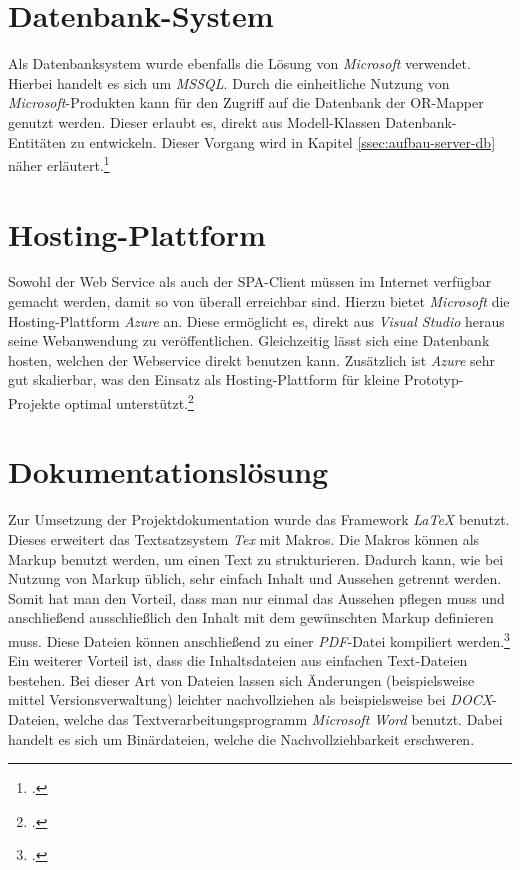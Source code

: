 \section{Datenbank-System}
\label{sec:DB-System}
Als Datenbanksystem wurde ebenfalls die Lösung von \textit{Microsoft} verwendet. Hierbei handelt es sich um \textit{\ac{MSSQL}}. Durch die einheitliche Nutzung von \textit{Microsoft}-Produkten kann für den Zugriff auf die Datenbank der \ac{OR-Mapper} genutzt werden. Dieser erlaubt es, direkt aus Modell-Klassen Datenbank-Entitäten zu entwickeln. Dieser Vorgang wird in Kapitel \ref{ssec:aufbau-server-db} näher erläutert.\footcite{online:SQLServer}
\section{Hosting-Plattform}
\label{sec:Hosting-Plattform}
Sowohl der Web Service als auch der \ac{SPA}-Client müssen im Internet verfügbar gemacht werden, damit so von überall erreichbar sind. Hierzu bietet \textit{Microsoft} die Hosting-Plattform \textit{Azure} an. Diese ermöglicht es, direkt aus \textit{\ac{Visual Studio}} heraus seine Webanwendung zu veröffentlichen. Gleichzeitig lässt sich eine Datenbank hosten, welchen der Webservice direkt benutzen kann. Zusätzlich ist \textit{Azure} sehr gut skalierbar, was den Einsatz als Hosting-Plattform für kleine Prototyp-Projekte optimal unterstützt.\footcite{online:Azure}
\section{Dokumentationslösung}
\label{sec:dokumentationslösung}
Zur Umsetzung der Projektdokumentation wurde das Framework \textit{LaTeX} benutzt. Dieses erweitert das Textsatzsystem \textit{Tex} mit Makros. Die Makros können als Markup benutzt werden, um einen Text zu strukturieren. Dadurch kann, wie bei Nutzung von Markup üblich, sehr einfach Inhalt und Aussehen getrennt werden. Somit hat man den Vorteil, dass man nur einmal das Aussehen pflegen muss und anschließend ausschließlich den Inhalt mit dem gewünschten Markup definieren muss. Diese Dateien können anschließend zu einer \textit{PDF}-Datei kompiliert werden.\footcite{online:definition-latex}\\ Ein weiterer Vorteil ist, dass die Inhaltsdateien aus einfachen Text-Dateien bestehen. Bei dieser Art von Dateien lassen sich Änderungen (beispielsweise mittel Versionsverwaltung) leichter nachvollziehen als beispielsweise bei \textit{DOCX}-Dateien, welche das Textverarbeitungsprogramm \textit{Microsoft Word} benutzt. Dabei handelt es sich um Binärdateien, welche die Nachvollziehbarkeit erschweren.
